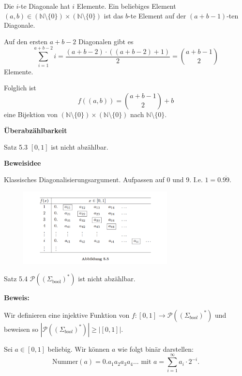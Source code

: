 \documentclass[a4paper, 11pt]{article}
\def\N{\mathbb{N}}
\begin{document}
            Die $i$-te Diagonale hat $i$ Elemente. Ein beliebiges Element $(a,b) \in (\N\setminus\{0\}) \times (\N \setminus \{0\})$ ist das $b$-te Element auf der $(a+b-1)$-ten Diagonale.
            
            Auf den ersten $a+b-2$ Diagonalen gibt es 
            $$\sum_{i = 1}^{a+b-2}i = \frac{(a+b-2)\cdot((a+b-2)+1)}{2} = \binom{a+b-1}{2}$$
            Elemente.
        
            Folglich ist 
            $$f((a,b)) = \binom{a+b-1}{2} + b$$
            eine Bijektion von $(\N\setminus\{0\}) \times (\N \setminus \{0\})$ nach $\N\setminus\{0\}$.
        
        
        
            \textbf{Überabzählbarkeit}

            \begin{mainbox}{Satz 5.3}
                $[0,1]$ ist nicht abzählbar.
            \end{mainbox}
            \textbf{Beweisidee}
            
            Klassisches Diagonalisierungsargument. Aufpassen auf $0$ und $9$. I.e. $1 = 0.\overline{99}$.
        
            \begin{figure}[htp]
                \includegraphics[width=0.7\textwidth]{Images/Diagonalisierung.png}
            \end{figure}
        
            \begin{mainbox}{Satz 5.4}
                $\mathcal{P}((\Sigma_{\text{bool}})^*)$ ist nicht abzählbar.
            \end{mainbox}
            \textbf{Beweis: }
        
                Wir definieren eine injektive Funktion von $f: [0, 1] \to \mathcal{P}((\Sigma_{bool})^*)$ und beweisen so $|\mathcal{P}((\Sigma_{bool})^*)| \geq |[0, 1]|$.
            
                Sei $a \in [0, 1]$ beliebig. Wir können $a$ wie folgt binär darstellen:
                $$\text{Nummer}(a) = 0.a_1a_2a_3a_4... \text{ mit } a = \sum_{i = 1}^{\infty} a_i\cdot 2^{-i}.$$ 
                
\end{document}
